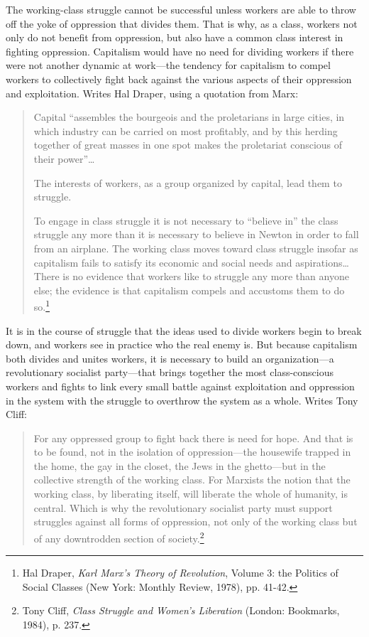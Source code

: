 The working-class struggle cannot be successful unless workers are able to throw off the yoke of oppression that divides them. That is why, as a class, workers not only do not benefit from oppression, but also have a common class interest in fighting oppression. Capitalism would have no need for dividing workers if there were not another dynamic at work---the tendency for capitalism to compel workers to collectively fight back against the various aspects of their oppression and exploitation. Writes Hal Draper, using a quotation from Marx:

\blockquote{Capital ``assembles the bourgeois and the proletarians in large cities, in which industry can be carried on most profitably, and by this herding together of great masses in one spot makes the proletariat conscious of their power''\ldots

The interests of workers, as a group organized by capital, lead them to struggle.

To engage in class struggle it is not necessary to ``believe in'' the class struggle any more than it is necessary to believe in Newton in order to fall from an airplane. The working class moves toward class struggle insofar as capitalism fails to satisfy its economic and social needs and aspirations\ldots There is no evidence that workers like to struggle any more than anyone else; the evidence is that capitalism compels and accustoms them to do so.\footnote{Hal Draper, \emph{Karl Marx's Theory of Revolution}, Volume 3: the Politics of Social Classes (New York: Monthly Review, 1978), pp. 41-42.}}

It is in the course of struggle that the ideas used to divide workers begin to break down, and workers see in practice who the real enemy is. But because capitalism both divides and unites workers, it is necessary to build an organization---a revolutionary socialist party---that brings together the most class-conscious workers and fights to link every small battle against exploitation and oppression in the system with the struggle to overthrow the system as a whole. Writes Tony Cliff:

\blockquote{For any oppressed group to fight back there is need for hope. And that is to be found, not in the isolation of oppression---the housewife trapped in the home, the gay in the closet, the Jews in the ghetto---but in the collective strength of the working class. For Marxists the notion that the working class, by liberating itself, will liberate the whole of humanity, is central. Which is why the revolutionary socialist party must support struggles against all forms of oppression, not only of the working class but of any downtrodden section of society.\footnote{Tony Cliff, \emph{Class Struggle and Women's Liberation} (London: Bookmarks, 1984), p. 237.}}


